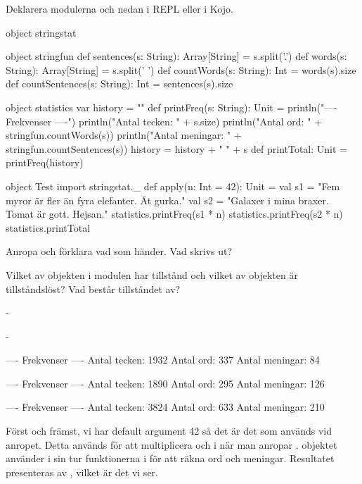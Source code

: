 \Subtask Deklarera modulerna  och  nedan i REPL eller i Kojo.

\begin{Code}
object stringstat {
  object stringfun {
    def sentences(s: String): Array[String] = s.split('.')
    def words(s: String): Array[String] = s.split(' ')
    def countWords(s: String): Int = words(s).size
    def countSentences(s: String): Int = sentences(s).size
  }

  object statistics {
    var history = ""
    def printFreq(s: String): Unit = {
      println("\n---- Frekvenser ----")
      println("Antal tecken:   " + s.size)
      println("Antal ord:      " + stringfun.countWords(s))
      println("Antal meningar: " + stringfun.countSentences(s))
      history = history + " " + s
    }
    def printTotal: Unit = printFreq(history)
  }
}

object Test {
  import stringstat._
  def apply(n: Int = 42): Unit = {
    val s1 = "Fem myror är fler än fyra elefanter. Ät gurka."
    val s2 = "Galaxer i mina braxer. Tomat är gott. Hejsan."
    statistics.printFreq(s1 * n)
    statistics.printFreq(s2 * n)
    statistics.printTotal
  }
}
\end{Code}

\Subtask Anropa  och förklara vad som händer. Vad skrivs ut?

\Subtask Vilket av objekten i modulen  har tillstånd och vilket av objekten är tillståndslöst? Vad består tillståndet av?


\SOLUTION


\TaskSolved \what


\SubtaskSolved  -

\SubtaskSolved  -

\SubtaskSolved
\begin{REPLnonum}

---- Frekvenser ----
Antal tecken: 1932
Antal ord: 337
Antal meningar: 84

---- Frekvenser ----
Antal tecken: 1890
Antal ord: 295
Antal meningar: 126

---- Frekvenser ----
Antal tecken: 3824
Antal ord: 633
Antal meningar: 210

\end{REPLnonum}

Först och främst, vi har default argument 42 så det är det som används vid anropet. Detta används för att multiplicera  och  i  när man anropar .  objektet använder i sin tur funktionerna i  för att räkna ord och meningar. Resultatet presenteras av , vilket är det vi ser.

